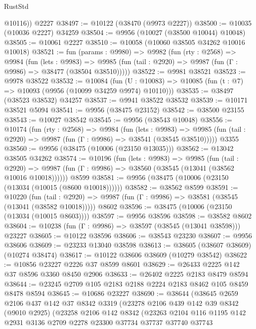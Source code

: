 \begin{lexlean}{RustStd}
\begin{coremodule}
        @10116))
    @2227
@38497 := @10122 (@38470 (@9973 @2227))
@38500 := @10035 (@10036 @2227) @34259
@38504 := @9956 (@10027 (@38500 @10044) @10048)
@38505 := @10061 @2227
@38510 := @10058 (@10060 @38505 @34262 @10016 @10018)
@38521 := fun (params : @9980) =>
  @9982
    (fun (rty : @2568) =>
    @9984
      (fun (lets : @9983) =>
      @9985 (fun (tail : @2920) => @9987 (fun (Γ : @9986) => @38477 (@38504 @38510)))))
@38522 := @9981 @38521
@38523 := @9978 @38522
@38532 := @10084
    (fun (U : @10083) => @10085 (fun (t : @7) => @10093 (@9956 (@10099 @34259 @9974) @10110)))
@38535 := @38497 (@38523 @38532) @34257
@38537 := @9941 @38522 @38532
@38539 := @10171 @38521 @5094
@38541 := @9956 (@38475 @23152)
@38542 := @38500 @23155
@38543 := @10027 @38542
@38545 := @9956 (@38543 @10048)
@38556 := @10174
    (fun (rty : @2568) =>
    @9984
      (fun (lets : @9983) =>
      @9985 (fun (tail : @2920) => @9987 (fun (Γ : @9986) => @38541 (@38545 @38510)))))
    @3355
@38560 := @9956 (@38475 (@10006 (@23150 @13035)))
@38562 := @13042 @38505 @34262
@38574 := @10196
    (fun (lets : @9983) =>
    @9985
      (fun (tail : @2920) =>
      @9987 (fun (Γ : @9986) => @38560 (@38545 (@13041 (@38562 @10016 @10018))))))
    @8599
@38581 := @9956 (@38475 (@10006 (@23150 (@13034 (@10015 (@8600 @10018))))))
@38582 := @38562 @8599
@38591 := @10220
    (fun (tail : @2920) => @9987 (fun (Γ : @9986) => @38581 (@38545 (@13041 (@38582 @10018)))))
    @8602
@38596 := @38475 (@10006 (@23150 (@13034 (@10015 @8603))))
@38597 := @9956 @38596
@38598 := @38582 @8602
@38604 := @10238 (fun (Γ : @9986) => @38597 (@38545 (@13041 @38598))) @23227
@38605 := @10122 @38596
@38606 := @38543 @23230
@38607 := @9956 @38606
@38609 := @23233 @13040 @38598
@38613 := @38605 (@38607 @38609) (@10274 @38474)
@38617 := @10122 @38606 @38609 (@10279 @38542)
@38622 := @10856 @23227 @2226 @37 @8599 @8601
@38629 := @26433 @2225 @142 @37 @8596 @3360 @8450 @2906
@38633 := @26402 @2225 @2183 @8479 @8594
@38644 := @23245 @2709 @105 @2183 @2188 @2224 @2183 @8462 @105 @8459 @8478 @8594
@38645 := @10686 @23227
@38690 := @38644
    (@38645
      @2659
      @2106
      @437
      @142
      @37
      @8342
      @3319
      (@23278
        @2106
        @439
        @142
        @39
        @8342
        (@9010 @2925)
        (@23258
          @2106
          @142
          @8342
          (@23263
            @2104
            @116
            @1195
            @142
            @2931
            @3136
            @2709
            @2278
            @23300
            @37734
            @37737
            @37740
            @37743

\end{coremodule}
\end{lexlean}
